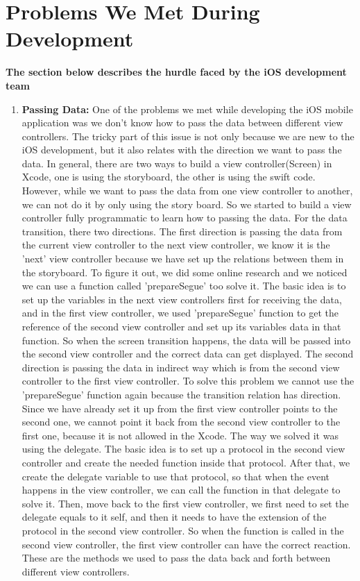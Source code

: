 \documentclass[onecolumn, draftclsnofoot,10pt, compsoc]{IEEEtran}
\begin{document}
\newpage
\section{Problems We Met During Development}

\textbf{The section below describes the hurdle faced by the iOS development team} \newline

\begin{enumerate}
  \item\textbf{Passing Data:}\newline
  One of the problems we met while developing the iOS mobile application was we don't know how to pass the data between different view controllers. The tricky part of this issue is not only because we are new to the iOS development, but it also relates with the direction we want to pass the data. In general, there are two ways to build a view controller(Screen) in Xcode, one is using the storyboard, the other is using the swift code. However, while we want to pass the data from one view controller to another, we can not do it by only using the story board. So we started to build a view controller fully programmatic to learn how to passing the data. For the data transition, there two directions. The first direction is passing the data from the current view controller to the next view controller, we know it is the 'next' view controller because we have set up the relations between them in the storyboard. To figure it out, we did some online research and we noticed we can use a function called 'prepareSegue' too solve it. The basic idea is to set up the variables in the next view controllers first for receiving the data, and in the first view controller, we used 'prepareSegue' function to get the reference of the second view controller and set up its variables data in that function. So when the screen transition happens, the data will be passed into the second view controller and the  correct data can get displayed. The second direction is passing the data in indirect way which is from the second view controller to the first view controller. To solve this problem we cannot use the 'prepareSegue' function again because the transition relation has direction. Since we have already set it up from the first view controller points to the second one, we cannot point it back from the second view controller to the first one, because it is not allowed in the Xcode. The way we solved it was using the delegate. The basic idea is to set up a protocol in the second view controller and create the needed function inside that protocol. After that, we create the delegate variable to use that protocol, so that when the event happens in the view controller, we can call the function in that delegate to solve it. Then, move back to the first view controller, we first need to set the delegate equals to it self, and then it needs to have the extension of the protocol in the second view controller. So when the function is called in the second view controller, the first view controller can have the correct reaction. These are the methods we used to pass the data back and forth between different view controllers. \newline
  

\end{enumerate}
\end{document}
